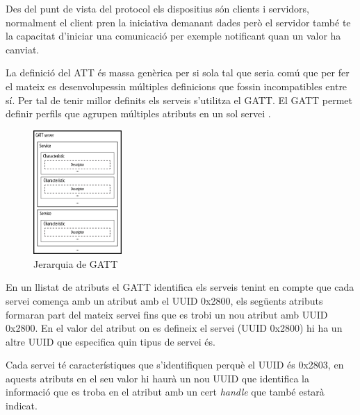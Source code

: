 Des del punt de vista del protocol els dispositius són clients i servidors, normalment el client pren la iniciativa demanant dades però el servidor també te la capacitat d'iniciar una comunicació per exemple notificant quan un valor ha canviat.

La definició del ATT és massa genèrica per si sola tal que seria comú que per fer el mateix es desenvolupessin múltiples definicions que fossin incompatibles entre sí.
Per tal de tenir millor definits els serveis s'utilitza el GATT. El GATT permet definir perfils que agrupen múltiples atributs en un sol servei \cite{services}.

\begin{figure}[h!]
	\begin{center}
		\includegraphics[width=0.3\textwidth]{./images/GATT_Hierarchy.png}
		\caption{Jerarquia de GATT \cite{GATT_Hierarchy}}
	\end{center}
\end{figure}

En un llistat de atributs el GATT identifica els serveis tenint en compte que cada servei comença amb un atribut amb el UUID 0x2800, els següents atributs formaran part del mateix servei fins que es trobi un nou atribut amb UUID 0x2800. En el valor del atribut on es defineix el servei (UUID 0x2800) hi ha un altre UUID que especifica quin tipus de servei és.

Cada servei té característiques \cite{characteristics} que s'identifiquen perquè el UUID és 0x2803, en aquests atributs en el seu valor hi haurà un nou UUID que identifica la informació que es troba en el atribut amb un cert \textit{handle} que també estarà indicat.

